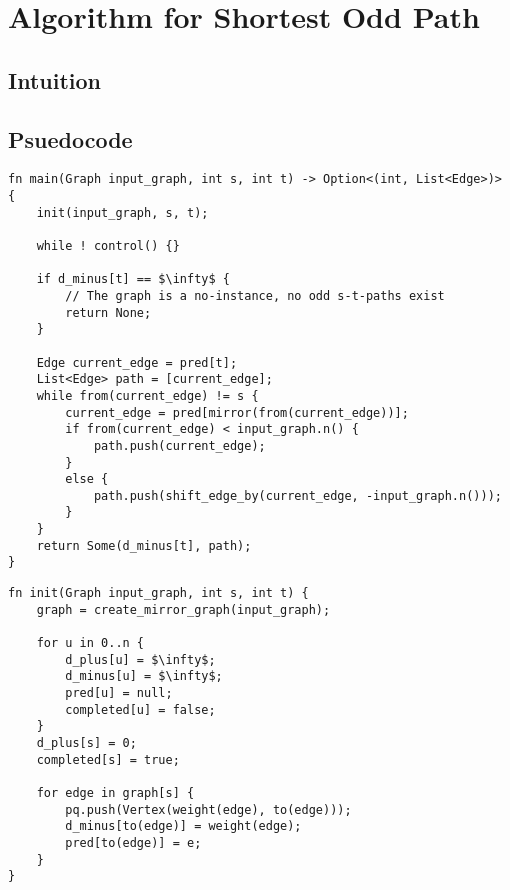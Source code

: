 \chapter{Algorithm for Shortest Odd Path}

\section{Intuition}

\section{Psuedocode}

\begin{lstlisting}[caption={Main},label=Listing,mathescape=true]
fn main(Graph input_graph, int s, int t) -> Option<(int, List<Edge>)> {
    init(input_graph, s, t);

    while ! control() {}

    if d_minus[t] == $\infty$ {
        // The graph is a no-instance, no odd s-t-paths exist
        return None;
    }

    Edge current_edge = pred[t];
    List<Edge> path = [current_edge];
    while from(current_edge) != s {
        current_edge = pred[mirror(from(current_edge))];
        if from(current_edge) < input_graph.n() {
            path.push(current_edge);
        }
        else {
            path.push(shift_edge_by(current_edge, -input_graph.n()));
        }
    }
    return Some(d_minus[t], path);
}
\end{lstlisting}

\begin{lstlisting}[caption={Initialization},label=Listing,mathescape=true]
fn init(Graph input_graph, int s, int t) {
    graph = create_mirror_graph(input_graph);

    for u in 0..n {
        d_plus[u] = $\infty$;
        d_minus[u] = $\infty$;
        pred[u] = null;
        completed[u] = false;
    }
    d_plus[s] = 0;
    completed[s] = true;

    for edge in graph[s] {
        pq.push(Vertex(weight(edge), to(edge)));
        d_minus[to(edge)] = weight(edge);
        pred[to(edge)] = e;
    }
}
\end{lstlisting}


